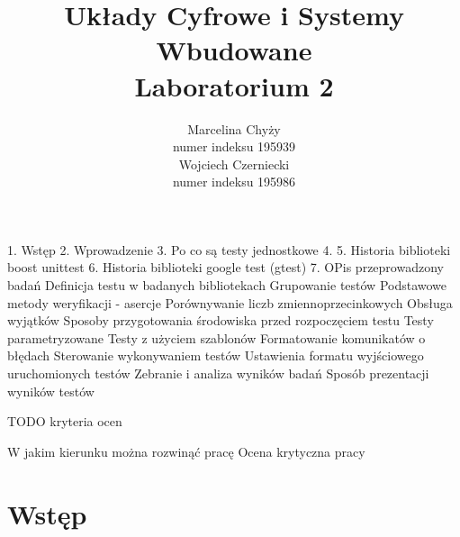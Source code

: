 \documentclass[12pt,a4paper,notitlepage]{report}
\author{Marcelina Chyży\\numer indeksu 195939\\Wojciech Czerniecki\\numer indeksu 195986}
\title{Układy Cyfrowe i Systemy Wbudowane \\ \small Laboratorium 2}
\makeatletter
\newcommand{\linia}{\rule{\linewidth}{0.4mm}}
\renewcommand{\maketitle}{
	\begin{titlepage}
		\vspace*{1cm}
		\begin{center}\small
			Politechnika Wrocławksa\\
			Wydział Elektorniki
		\end{center}
		\vspace{3cm}
		\noindent
		\linia
		\begin{center}
			\LARGE \textsc{\@title}
		\end{center}
		\linia
		\vspace{5.5cm}
		\begin{flushright}
			\begin{minipage}{5cm}
				\textit{\small Autorzy:}\\
				\normalsize \textsc{\@author} \par
			\end{minipage}
		\end{flushright}
		\vspace*{\stretch{6}}
		\begin{center}
			\@date
		\end{center}
	\end{titlepage}%
}
\makeatother
\begin{document}
	
	
	\newpage\thispagestyle{empty}
	\mbox{}
	
	\tableofcontents
	
	\renewcommand*\sectionmark[1]{\markboth{#1}{}}
	\renewcommand*\subsectionmark[1]{\markright{#1}}
	
1. Wstęp
2. Wprowadzenie
3. Po co są testy jednostkowe
4. 
5. Historia biblioteki boost unittest
6. Historia biblioteki google test (gtest)
7. OPis przeprowadzony badań
Definicja testu w badanych bibliotekach
Grupowanie testów
Podstawowe metody weryfikacji - asercje
Porównywanie liczb zmiennoprzecinkowych
Obsługa wyjątków
Sposoby przygotowania środowiska przed rozpoczęciem testu
Testy parametryzowane
Testy z użyciem szablonów
Formatowanie komunikatów o błędach
Sterowanie wykonywaniem testów
Ustawienia formatu wyjściowego uruchomionych testów
Zebranie i analiza wyników badań
Sposób prezentacji wyników testów

TODO kryteria ocen

W jakim kierunku można rozwinąć pracę
Ocena krytyczna pracy

\chapter{Wstęp}
\end{document}
